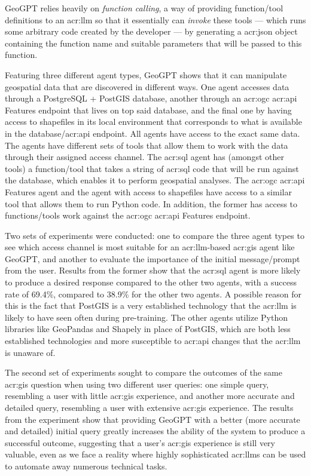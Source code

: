 GeoGPT relies heavily on \textit{function calling}, a way of providing function/tool definitions to an \acrshort{acr:llm} so that it essentially can \textit{invoke} these tools --- which runs some arbitrary code created by the developer --- by generating a \acrshort{acr:json} object containing the function name and suitable parameters that will be passed to this function.

Featuring three different agent types, GeoGPT shows that it can manipulate geospatial data that are discovered in different ways. One agent accesses data through a PostgreSQL + PostGIS database, another through an \acrshort{acr:ogc} \acrshort{acr:api} Features endpoint that lives on top said database, and the final one by having access to shapefiles in its local environment that corresponds to what is available in the database/\acrshort{acr:api} endpoint. All agents have access to the exact same data. The agents have different sets of tools that allow them to work with the data through their assigned access channel. The \acrshort{acr:sql} agent has (amongst other tools) a function/tool that takes a string of \acrshort{acr:sql} code that will be run against the database, which enables it to perform geospatial analyses. The \acrshort{acr:ogc} \acrshort{acr:api} Features agent and the agent with access to shapefiles have access to a similar tool that allows them to run Python code. In addition, the former has access to functions/tools work against the \acrshort{acr:ogc} \acrshort{acr:api} Features endpoint.

Two sets of experiments were conducted: one to compare the three agent types to see which access channel is most suitable for an \acrshort{acr:llm}-based \acrshort{acr:gis} agent like GeoGPT, and another to evaluate the importance of the initial message/prompt from the user. Results from the former show that the \acrshort{acr:sql} agent is more likely to produce a desired response compared to the other two agents, with a success rate of 69.4\%, compared to 38.9\% for the other two agents. A possible reason for this is the fact that PostGIS is a very established technology that the \acrshort{acr:llm} is likely to have seen often during pre-training. The other agents utilize Python libraries like GeoPandas and Shapely in place of PostGIS, which are both less established technologies and more susceptible to \acrshort{acr:api} changes that the \acrshort{acr:llm} is unaware of.

The second set of experiments sought to compare the outcomes of the same \acrshort{acr:gis} question when using two different user queries: one simple query, resembling a user with little \acrshort{acr:gis} experience, and another more accurate and detailed query, resembling a user with extensive \acrshort{acr:gis} experience. The results from the experiment show that providing GeoGPT with a better (more accurate and detailed) initial query greatly increases the ability of the system to produce a successful outcome, suggesting that a user's \acrshort{acr:gis} experience is still very valuable, even as we face a reality where highly sophisticated \glspl{acr:llm} can be used to automate away numerous technical tasks.

